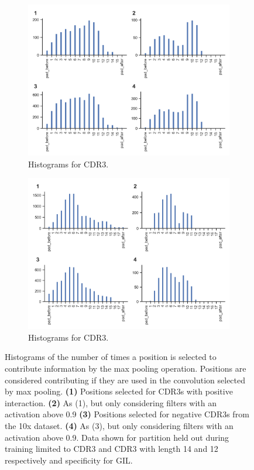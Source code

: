 \begin{figure}[H]
\centering
\begin{subfigure}[b]{0.7\textwidth}
   \includegraphics[width=1\linewidth]{figures/attention_results/maxpool_cdr3a_gil12.png}
   \caption{Histograms for CDR3{\textalpha}.}
   \label{fig:pool_gil12a} 
\end{subfigure}

\begin{subfigure}[b]{0.7\textwidth}
   \includegraphics[width=1\linewidth]{figures/attention_results/maxpool_cdr3b_gil12.png}
   \caption{Histograms for CDR3{\textbeta}.}
   \label{fig:pool_gil12b}
\end{subfigure}
\caption{Histograms of the number of times a position is selected to contribute information by the max pooling operation. Positions are considered contributing if they are used in the convolution selected by max pooling. \textbf{(1)} Positions selected for CDR3s with positive interaction. \textbf{(2)} As (1), but only considering filters with an activation above 0.9 \textbf{(3)} Positions selected for negative CDR3s from the 10x dataset. \textbf{(4)} As (3), but only considering filters with an activation above 0.9. Data shown for partition held out during training limited to CDR3{\textalpha} and CDR3{\textbeta} with length 14 and 12 respectively and specificity for GIL.}
\end{figure}

